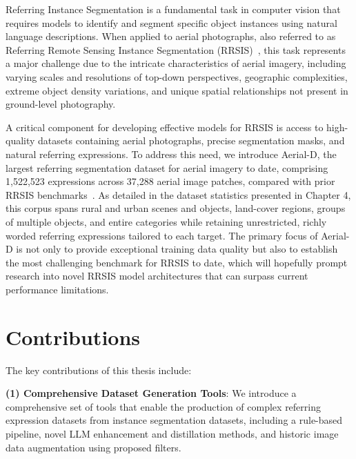 \cleardoublepage
\label{chap:intro}
Referring Instance Segmentation is a fundamental task in computer vision that requires models to identify and segment specific object instances using natural language descriptions. When applied to aerial photographs, also referred to as Referring Remote Sensing Instance Segmentation (RRSIS)~\cite{yuan2023rrsis}, this task represents a major challenge due to the intricate characteristics of aerial imagery, including varying scales and resolutions of top-down perspectives, geographic complexities, extreme object density variations, and unique spatial relationships not present in ground-level photography.

A critical component for developing effective models for RRSIS is access to high-quality datasets containing aerial photographs, precise segmentation masks, and natural referring expressions. To address this need, we introduce Aerial-D, the largest referring segmentation dataset for aerial imagery to date, comprising 1,522,523 expressions across 37,288 aerial image patches, compared with prior RRSIS benchmarks~\cite{yuan2023rrsis,liu2024rotated,yang2024large}. As detailed in the dataset statistics presented in Chapter 4, this corpus spans rural and urban scenes and objects, land-cover regions, groups of multiple objects, and entire categories while retaining unrestricted, richly worded referring expressions tailored to each target. The primary focus of Aerial-D is not only to provide exceptional training data quality but also to establish the most challenging benchmark for RRSIS to date, which will hopefully prompt research into novel RRSIS model architectures that can surpass current performance limitations.

\section{Contributions}

The key contributions of this thesis include:

\textbf{(1) Comprehensive Dataset Generation Tools}: We introduce a comprehensive set of tools that enable the production of complex referring expression datasets from instance segmentation datasets, including a rule-based pipeline, novel LLM enhancement and distillation methods, and historic image data augmentation using proposed filters.

